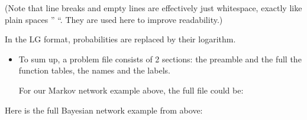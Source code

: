 \documentclass[letterpaper,10pt,openany,oneside,english]{sphinxmanual}
\begin{document}
\sphinxAtStartPar
(Note that line breaks and empty lines are effectively just whitespace, exactly like plain spaces ” “. They are used here to improve readability.)

\sphinxAtStartPar
In the LG format, probabilities are replaced by their logarithm.
\begin{itemize}
\item {} 
\sphinxAtStartPar
{}

\sphinxAtStartPar
To sum up, a problem file consists of 2 sections: the preamble and the full the function tables, the names and the labels.

\sphinxAtStartPar
For our Markov network example above, the full file could be:

\begin{sphinxVerbatim}[commandchars=\\\{\}]
  
  
   

  
  

   
   
   
   
\end{sphinxVerbatim}

\end{itemize}

\sphinxAtStartPar
Here is the full Bayesian network example from above:
\end{document}
